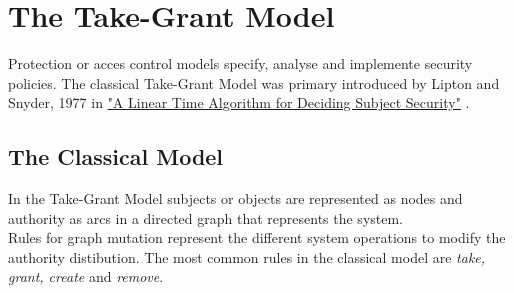 \section{The Take-Grant Model}	
Protection or acces control models specify, analyse and implemente security policies. 
The classical Take-Grant Model was primary introduced by Lipton and Snyder, 1977 in  \href{https://www.cs.nmt.edu/~doshin/t/s06/cs589/pub/2.JLS-TG.pdf}{%
"A Linear Time Algorithm for Deciding Subject Security"} \cite{1TG}.
\subsection{The Classical Model}
In the Take-Grant Model \cite{TakeG} subjects or objects are represented as nodes and authority as arcs in a directed graph that represents the system. \\ 
Rules for graph mutation represent the different system operations to modify  the authority distibution. 
The most common rules in the classical model are \textit{take, grant, create} and \textit{remove}. 
	
